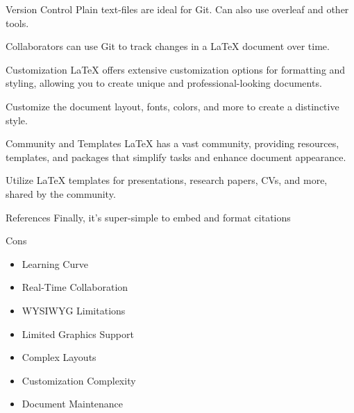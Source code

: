 \documentclass{beamer}
\begin{document}
\begin{frame}{Version Control}
   Plain text-files are ideal for Git. Can also use overleaf and other tools.
    
    \begin{example}
        Collaborators can use Git to track changes in a LaTeX document over time.
    \end{example}
\end{frame}

\begin{frame}{Customization}
    LaTeX offers extensive customization options for formatting and styling, allowing you to create unique and professional-looking documents.
    
    \begin{example}
        Customize the document layout, fonts, colors, and more to create a distinctive style.
    \end{example}
\end{frame}

\begin{frame}{Community and Templates}
    LaTeX has a vast community, providing resources, templates, and packages that simplify tasks and enhance document appearance.
    
    \begin{example}
        Utilize LaTeX templates for presentations, research papers, CVs, and more, shared by the community.
    \end{example}
\end{frame}

\begin{frame}{References}\label{slide:references}
Finally, it's super-simple to embed and format citations \cite{latexcompanion}
\begin{example}
    
    
\end{example}
\end{frame}

\begin{frame}{Cons}
    \begin{itemize}
        \item Learning Curve
        \item Real-Time Collaboration
        \item WYSIWYG Limitations
        \item Limited Graphics Support
        \item Complex Layouts
        \item Customization Complexity
        \item Document Maintenance
    \end{itemize}
\end{frame}
\end{document}
